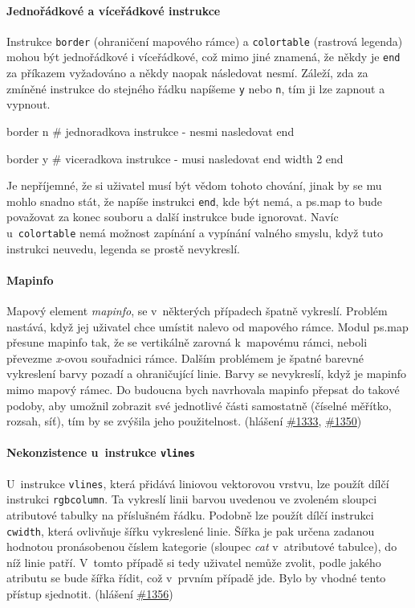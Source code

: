 \documentclass[a4paper,12pt,draft]{article}
\newcommand{\instr}[1]{\lstinline[style=psmapInline]|#1|}
\begin{document}
\paragraph*{Jednořádkové a víceřádkové instrukce}
\label{sec:psmap:singleline}
Instrukce \instr{border} (ohraničení mapo\-vého rámce) a \instr{colortable}
(rastrová legenda) mohou být jednořádkové i víceřádkové, což mimo
jiné znamená, že někdy je \instr{end} za příkazem vyžadováno a někdy
naopak následovat nesmí. Záleží, zda za zmíněné instrukce do stejného
řádku napíšeme \instr{y} nebo \instr{n}, tím ji lze zapnout a vypnout.
\begin{psmap}
border n    # jednoradkova instrukce - nesmi nasledovat end

border y    # viceradkova instrukce - musi nasledovat end
   width 2
end
\end{psmap}
Je nepříjemné, že si uživatel musí být vědom tohoto chování,
jinak by se mu mohlo snadno stát, že napíše instrukci \instr{end}, kde
být nemá, a ps.map to bude považovat za konec souboru a další
instrukce bude ignorovat.
Navíc u~\instr{colortable} nemá možnost zapínání a vypínání valného
smyslu, když tuto instrukci neuvedu, legenda se prostě nevykreslí.


\paragraph*{Mapinfo}
\label{sec:psmap:mapinfo}
Mapový element \emph{mapinfo}, se v~některých případech špatně
vykreslí. Problém nastává, když jej uživatel chce umístit nalevo
od mapového rámce. Modul ps.map přesune mapinfo tak, že se
vertikálně zarovná k~mapovému rámci, neboli převezme \emph{x}-ovou
souřadnici rámce. Dalším problémem je špatné barevné vykreslení barvy
pozadí a ohraničující linie. Barvy se nevykreslí, když je mapinfo
mimo mapový rámec.
Do budoucna bych navrhovala mapinfo přepsat do takové podoby, aby umožnil
zobrazit své jednotlivé části samostatně (číselné měřítko, rozsah, síť), tím
by se zvýšila jeho použitelnost.
(hlášení \href{https://trac.osgeo.org/grass/ticket/1333}{\#1333},
\href{https://trac.osgeo.org/grass/ticket/1350}{\#1350})


\paragraph*{Nekonzistence u~instrukce \instr{vlines}}
\label{sec:psmap:vlines}
U~instrukce \instr{vlines}, která přidává liniovou vektorovou vrstvu,
lze použít dílčí instrukci \instr{rgbcolumn}. Ta vykreslí   linii
barvou uvedenou ve zvoleném sloupci atributové tabulky na příslušném
řádku. Podobně lze použít dílčí instrukci \instr{cwidth}, která
ovlivňuje šířku vykreslené linie. Šířka je pak určena zadanou hodnotou
pronásobenou číslem kategorie (sloupec \emph{cat} v~atributové tabulce),
do níž linie patří. V~tomto případě si tedy uživatel nemůže zvolit,
podle jakého atributu se bude šířka řídit, což v~prvním případě
jde. Bylo by vhodné tento přístup sjednotit.
(hlášení \href{https://trac.osgeo.org/grass/ticket/1356}{\#1356})
\end{document}
